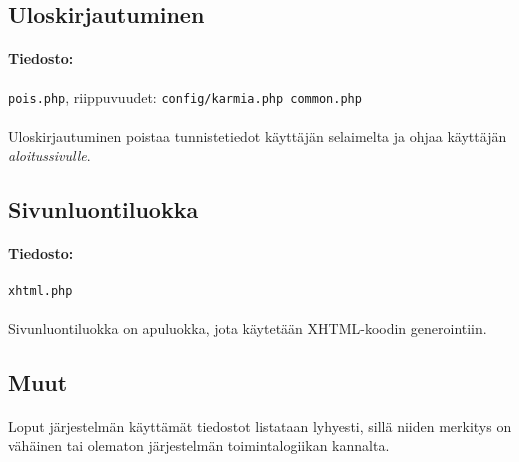 \documentclass[11pt]{article}
\begin{document}

\subsection{Uloskirjautuminen}

\paragraph{Tiedosto:} \large{\texttt{pois.php}}, riippuvuudet: \texttt{config/karmia.php common.php}

\paragraph{} Uloskirjautuminen poistaa tunnistetiedot käyttäjän selaimelta ja ohjaa käyttäjän \emph{aloitussivulle}.


\subsection{Sivunluontiluokka}

\paragraph{Tiedosto:} \large{\texttt{xhtml.php}}

\paragraph{} Sivunluontiluokka on apuluokka, jota käytetään XHTML-koodin generointiin.


\subsection{Muut}

\paragraph{} Loput järjestelmän käyttämät tiedostot listataan lyhyesti, sillä niiden merkitys on vähäinen tai olematon järjestelmän toimintalogiikan kannalta.
\end{document}
